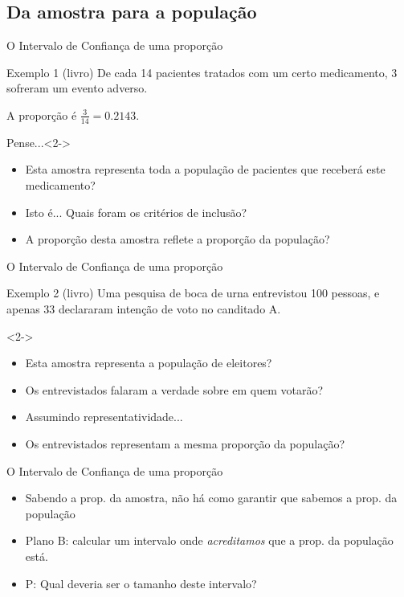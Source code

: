 \documentclass{beamer}
\begin{document}
\subsection{Da amostra para a população}

\begin{frame}{O Intervalo de Confiança de uma proporção}
  \begin{exampleblock}{Exemplo 1 (livro)}
    De cada 14 pacientes tratados com um certo medicamento, 3 sofreram um evento adverso.

    A proporção é $\frac{3}{14} = 0.2143$.
  \end{exampleblock}
  \begin{block}{Pense...}<2->
    \begin{itemize}
    \item Esta amostra representa toda a população de pacientes que receberá este medicamento?
    \item<3-> Isto é... Quais foram os critérios de inclusão?
    \item<4-> A proporção desta amostra reflete a proporção da população?
    \end{itemize}
  \end{block}

\end{frame}

\begin{frame}{O Intervalo de Confiança de uma proporção}
    \begin{exampleblock}{Exemplo 2 (livro)}
    Uma pesquisa de boca de urna entrevistou 100 pessoas, e apenas 33 declararam intenção de voto no canditado A.

  \end{exampleblock}
  \begin{block}{}<2->
    \begin{itemize}
    \item Esta amostra representa a população de eleitores?
    \item<3-> Os entrevistados falaram a verdade sobre em quem votarão?
    \item<4-> Assumindo representatividade...
    \item<4-> Os entrevistados representam a mesma proporção da população?
    \end{itemize}
  \end{block}
\end{frame}

\begin{frame}{O Intervalo de Confiança de uma proporção}
  \begin{itemize}
  \item Sabendo a prop. da amostra, não há como garantir que sabemos a prop. da população
  \item Plano B: calcular um intervalo onde {\em acreditamos} que a prop. da população está.
  \item P: Qual deveria ser o tamanho deste intervalo?
  \end{itemize}
\end{frame}
\end{document}
